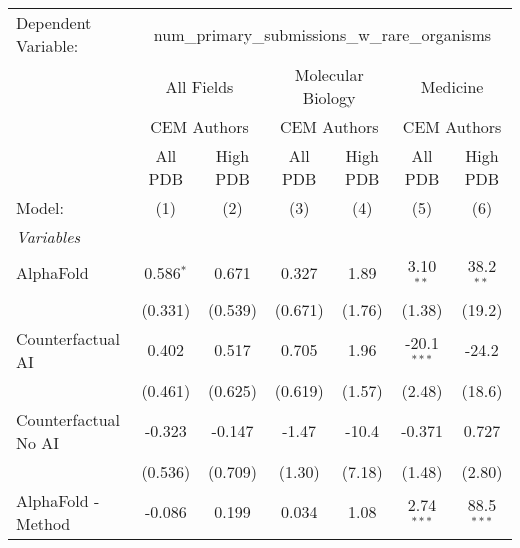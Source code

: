 \begingroup
\centering
\begin{tabular}{lcccccc}
   \tabularnewline \midrule \midrule
   Dependent Variable: & \multicolumn{6}{c}{num\_primary\_submissions\_w\_rare\_organisms}\\
 & \multicolumn{2}{c}{All Fields} & \multicolumn{2}{c}{Molecular Biology} & \multicolumn{2}{c}{Medicine} \\
\cmidrule(lr){2-3} \cmidrule(lr){4-5} \cmidrule(lr){6-7}
 & \multicolumn{2}{c}{CEM Authors} & \multicolumn{2}{c}{CEM Authors} & \multicolumn{2}{c}{CEM Authors} \\
\cmidrule(lr){2-3} \cmidrule(lr){4-5} \cmidrule(lr){6-7}
 & \multicolumn{1}{c}{All PDB} & \multicolumn{1}{c}{High PDB} & \multicolumn{1}{c}{All PDB} & \multicolumn{1}{c}{High PDB} & \multicolumn{1}{c}{All PDB} & \multicolumn{1}{c}{High PDB} \\
\cmidrule(lr){2-2} \cmidrule(lr){3-3} \cmidrule(lr){4-4} \cmidrule(lr){5-5} \cmidrule(lr){6-6} \cmidrule(lr){7-7}
   Model:                                                     & (1)           & (2)           & (3)           & (4)     & (5)           & (6)\\  
   \midrule
   \emph{Variables}\\
   AlphaFold                                                  & 0.586$^{*}$   & 0.671         & 0.327         & 1.89    & 3.10$^{**}$   & 38.2$^{**}$\\   
                                                              & (0.331)       & (0.539)       & (0.671)       & (1.76)  & (1.38)        & (19.2)\\   
   Counterfactual AI                                          & 0.402         & 0.517         & 0.705         & 1.96    & -20.1$^{***}$ & -24.2\\   
                                                              & (0.461)       & (0.625)       & (0.619)       & (1.57)  & (2.48)        & (18.6)\\   
   Counterfactual No AI                                       & -0.323        & -0.147        & -1.47         & -10.4   & -0.371        & 0.727\\   
                                                              & (0.536)       & (0.709)       & (1.30)        & (7.18)  & (1.48)        & (2.80)\\   
   AlphaFold - Method                                         & -0.086        & 0.199         & 0.034         & 1.08    & 2.74$^{***}$  & 88.5$^{***}$\\   

\end{tabular}
